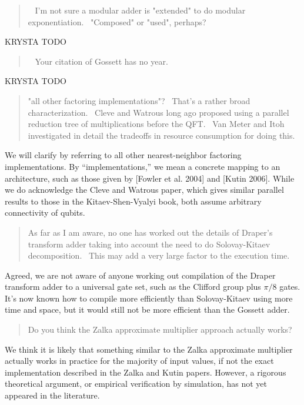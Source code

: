 \documentclass{article}
\theoremstyle{plain} \newtheorem{lemma}{Lemma}
\begin{document}
\begin{quote}
  I'm not sure a modular adder is "extended" to do modular 
exponentiation.  "Composed" or "used", perhaps? 
\end{quote}

KRYSTA TODO

\begin{quote}
  Your citation of Gossett has no year. 
\end{quote}

KRYSTA TODO

\begin{quote}
"all other factoring implementations"?  That's a rather broad 
characterization.  Cleve and Watrous long ago proposed using a 
parallel reduction tree of multiplications before the QFT.  Van Meter 
and Itoh investigated in detail the tradeoffs in resource consumption 
for doing this. 
\end{quote}

We will clarify by referring to all other nearest-neighbor factoring
implementations. By ``implementations,'' we mean a concrete mapping to an
architecture, such as those given by [Fowler et al. 2004] and [Kutin 2006].
While we do acknowledge the Cleve and Watrous paper, which gives
similar parallel results to those in the Kitaev-Shen-Vyalyi book, both
assume arbitrary connectivity of qubits.

\begin{quote}
As far as I am aware, no one has worked out the details of Draper's 
transform adder taking into account the need to do Solovay-Kitaev 
decomposition.  This may add a very large factor to the execution 
time. 
\end{quote}

Agreed, we are not aware of anyone working out compilation of the Draper
transform adder to a universal gate set, such as the Clifford group plus
$\pi/8$ gates. It's now known how to compile more efficiently
than Solovay-Kitaev using more time and space, but it would still not be
more efficient than the Gossett adder.

\begin{quote}
Do you think the Zalka approximate multiplier approach actually works? 
\end{quote}

We think it is likely that something similar to the Zalka approximate
multiplier actually works in practice for the majority of input values,
if not the exact implementation described in
the Zalka and Kutin papers. However, a rigorous theoretical argument, or
empirical verification by simulation, has not yet appeared in the literature.
\end{document}
